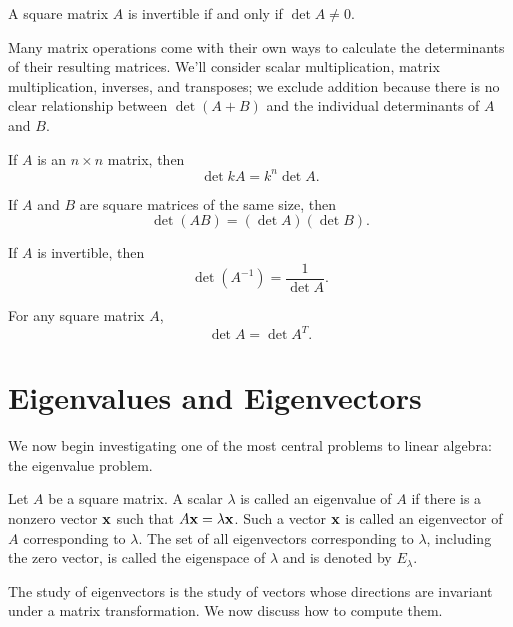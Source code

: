\documentclass[../m073main.tex]{subfiles}
\begin{document}
\begin{theorem}
	A square matrix $A$ is invertible if and only if $\det A \neq 0$.
\end{theorem}

Many matrix operations come with their own ways to calculate the determinants of their resulting matrices.
We'll consider scalar multiplication, matrix multiplication, inverses, and transposes; we exclude addition because there is no clear relationship between $\det (A + B)$ and the individual determinants of $A$ and $B$.

\begin{theorem}
	If $A$ is an $n \times n$ matrix, then
	\[ \det kA = k^n \det A. \]
\end{theorem}

\begin{theorem}
	If $A$ and $B$ are square matrices of the same size, then
	\[ \det (AB) = (\det A)(\det B). \]
\end{theorem}

\begin{theorem}
	If $A$ is invertible, then
	\[ \det (A^{-1}) = \frac{1}{\det A}. \]
\end{theorem}

\begin{theorem}
	For any square matrix $A$,
	\[ \det A = \det A^T. \]
\end{theorem}

\section{Eigenvalues and Eigenvectors}
We now begin investigating one of the most central problems to linear algebra: the eigenvalue problem.

\begin{definition}
	Let $A$ be a square matrix.
	A scalar $\lambda$ is called an eigenvalue of $A$ if there is a nonzero vector $\mathbf{x}$ such that $A \mathbf{x} = \lambda \mathbf{x}$.
	Such a vector $\mathbf{x}$ is called an eigenvector of $A$ corresponding to $\lambda$.
	The set of all eigenvectors corresponding to $\lambda$, including the zero vector, is called the eigenspace of $\lambda$ and is denoted by $E_\lambda$.
\end{definition}

The study of eigenvectors is the study of vectors whose directions are invariant under a matrix transformation.
We now discuss how to compute them.
\end{document}
